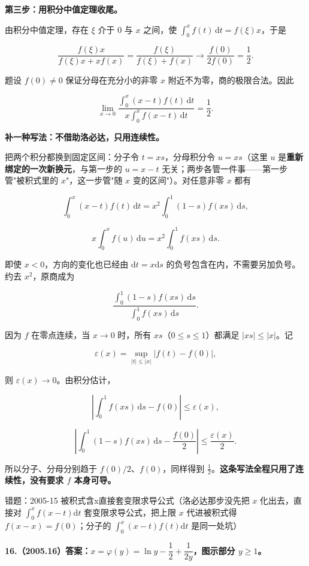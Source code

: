 \documentclass[UTF8,11pt,fontset=windows]{ctexart}
\begin{document}
\textbf{第三步：用积分中值定理收尾。}

由积分中值定理，存在 $\xi$ 介于 $0$ 与 $x$ 之间，使 $\displaystyle\int_0^xf(t)\,\mathrm dt=f(\xi)x$，于是

$$
\frac{f(\xi)x}{f(\xi)x+xf(x)}
=\frac{f(\xi)}{f(\xi)+f(x)}
\longrightarrow\frac{f(0)}{2f(0)}=\frac12 .
$$

题设 $f(0)\ne0$ 保证分母在充分小的非零 $x$ 附近不为零，商的极限合法。因此

$$
\boxed{\lim_{x\to0}
\frac{\int_0^x(x-t)f(t)\,\mathrm dt}
{x\int_0^xf(x-t)\,\mathrm dt}=\frac12.}
$$

\textbf{补一种写法：不借助洛必达，只用连续性。}

把两个积分都换到固定区间：分子令 $t=xs$，分母积分令 $u=xs$（这里 $u$ 是\textbf{重新绑定的一次新换元}，与第一步的 $u=x-t$ 无关；两步各管一件事——第一步管"被积式里的 $x$"，这一步管"随 $x$ 变的区间"）。对任意非零 $x$ 都有

$$
\int_0^x(x-t)f(t)\,\mathrm dt
=x^2\int_0^1(1-s)f(xs)\,\mathrm ds,
$$

$$
x\int_0^x f(u)\,\mathrm du
=x^2\int_0^1f(xs)\,\mathrm ds.
$$

即使 $x<0$，方向的变化也已经由 $\mathrm dt=x\mathrm ds$ 的负号包含在内，不需要另加负号。约去 $x^2$，原商成为

$$
\frac{\int_0^1(1-s)f(xs)\,\mathrm ds}
{\int_0^1f(xs)\,\mathrm ds}.
$$

因为 $f$ 在零点连续，当 $x\to0$ 时，所有 $xs$（$0\le s\le1$）都满足 $|xs|\le|x|$。记

$$
\varepsilon(x)=\sup_{|t|\le|x|}|f(t)-f(0)|,
$$

则 $\varepsilon(x)\to0$。由积分估计，

$$
\left|\int_0^1 f(xs)\,\mathrm ds-f(0)\right|
\le\varepsilon(x),
$$

$$
\left|\int_0^1(1-s)f(xs)\,\mathrm ds-\frac{f(0)}2\right|
\le\frac{\varepsilon(x)}2.
$$

所以分子、分母分别趋于 $f(0)/2$、$f(0)$，同样得到 $\frac12$。\textbf{这条写法全程只用了连续性，没有要求 $f$ 本身可导。}

\begingroup\color{gray}错题：2005-15 被积式含x直接套变限求导公式（洛必达那步没先把 $x$ 化出去，直接对 $\int_0^xf(x-t)\mathrm dt$ 套变限求导公式，把上限 $x$ 代进被积式得 $f(x-x)=f(0)$；分子的 $\int_0^x(x-t)f(t)\mathrm dt$ 是同一处坑）\par\endgroup

\clearpage

\textbf{16.（2005.16）答案：$x=\varphi(y)=\ln y-\dfrac12+\dfrac1{2y}$，图示部分 $y\ge1$。}
\end{document}
